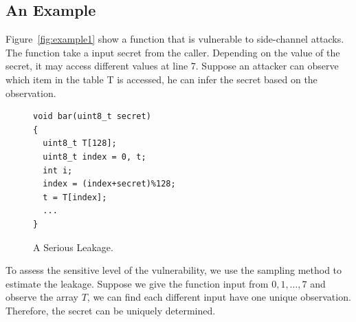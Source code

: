 \subsection{An Example}
Figure~\ref{fig:example1} show a function that is vulnerable to side-channel attacks. The function take a input secret from the caller. Depending on the value of the secret, it may access different values at line 7. Suppose an attacker can observe which item in the table \textsf{T} is accessed, he can infer the secret based on the observation.
\begin{figure}[h]
  \begin{minipage}{0.6\linewidth}
    \begin{lstlisting}[xleftmargin=.15\textwidth,xrightmargin=.30\textwidth]
void bar(uint8_t secret)
{
  uint8_t T[128];
  uint8_t index = 0, t;
  int i;
  index = (index+secret)%128;
  t = T[index];
  ...
}
\end{lstlisting}
  \end{minipage}
  \hfill
  \begin{minipage}{0.4\linewidth}
  \end{minipage}
  \caption{A Serious Leakage.}\label{chapter5:fig:example1}
\end{figure}

To assess the sensitive level of the vulnerability, we use the sampling method to estimate the leakage. Suppose we give the function input from $0, 1, \dots, 7$ and observe the array $T$, we can find each different input have one unique observation. Therefore, the secret can be uniquely determined.

